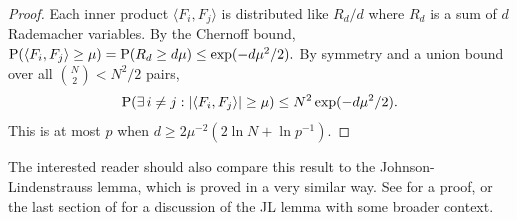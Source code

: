 \begin{proof}
    Each inner product $\langle F_i, F_j \rangle$ is distributed like $R_d / d$ where $R_d$ is a sum of $d$ Rademacher variables. By the Chernoff bound, $\operatorname{P}(\langle F_i, F_j \rangle \ge \mu) = \operatorname{P}(R_d \ge d\mu) \le \exp(- d \mu^2 / 2).$ By symmetry and a union bound over all $\binom N 2 < N^2 / 2$ pairs,
    $$
    \operatorname{P}(\exists\, i \neq j : \lvert \langle F_i, F_j \rangle \rvert \ge \mu) \le N^2 \exp(- d \mu^2 / 2).
    $$
    This is at most $p$ when $d \ge 2 \mu^{-2} (2 \ln N + \ln p^{-1}).$
\end{proof}

The interested reader should also compare this result to the Johnson-Lindenstrauss lemma, which is proved in a very similar way. See \citet{dasgupta_elementary_2003} for a proof, or the last section of \citet{foucart_sparse_2013} for a discussion of the JL lemma with some broader context.

